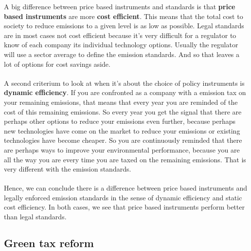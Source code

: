 \documentclass[../summary.tex]{subfiles}
\begin{document}
	   A big difference between price based instruments and standards is that \textbf{price based instruments} are more \textbf{cost efficient}. This means that the total cost to society to reduce emissions to a given level is as low as possible. Legal standards are in most cases not cost efficient because it's very difficult for a regulator to know of each company its individual technology options. Usually the regulator will use a sector average to define the emission standards. And so that leaves a lot of options for cost savings aside.
	   \\\\
	   A second criterium to look at when it's about the choice of policy instruments is \textbf{dynamic efficiency}. If you are confronted as a company with a emission tax on your remaining emissions, that means that every year you are reminded of the cost of this remaining emissions. So every year you get the signal that there are perhaps other options to reduce your emissions even further, because perhaps new technologies have come on the market to reduce your emissions or existing technologies have become cheaper. So you are continuously reminded that there are perhaps ways to improve your environmental performance, because you are all the way you are every time you are taxed on the remaining emissions. That is very different with the emission standards.
	   \\\\
	   Hence, we can conclude there is a difference between price based instruments and legally enforced emission standards in the sense of dynamic efficiency and static cost efficiency. In both cases, we see that price based instruments perform better than legal standards.
	  
	  \subsection{Green tax reform}
	  
\end{document}
